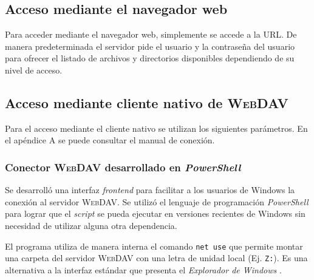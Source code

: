       \subsection {Acceso mediante el navegador web}

Para acceder mediante el navegador web, simplemente se accede a la URL. De manera predeterminada el servidor pide el usuario y la contrase\~{n}a del usuario para ofrecer el listado de  archivos y directorios disponibles dependiendo de su nivel de acceso.

      \subsection {Acceso mediante cliente nativo de \textsc{WebDAV}}

Para el acceso mediante el cliente nativo se utilizan los siguientes par\'{a}metros. En el ap\'{e}ndice A se puede consultar el manual de conexi\'{o}n.

{
 \begin{table}[H]
 \caption{Par\'{a}metros de conexi\'{o}n \textsc{WebDAV}}{}
 \label{tab:webdav-parameters}
 \noindent{} %
 \end{table}
}

        \subsubsection {Conector \textsc{WebDAV} desarrollado en \textsl{PowerShell}}

Se desarroll\'{o} una interfaz \textit{frontend} para facilitar a los usuarios de Windows la conexi\'{o}n al servidor \textsc{WebDAV}. Se utiliz\'{o} el lenguaje de programaci\'{o}n \textsl{PowerShell} para lograr que el \textit{script} se pueda ejecutar en versiones recientes de Windows sin necesidad de utilizar alguna otra dependencia.

El programa utiliza de manera interna el comando \texttt{net use} \cite{_net_????} que permite montar una carpeta del servidor \textsc{WebDAV} con una letra de unidad local (Ej. \texttt{Z:}). Es una alternativa a la interfaz est\'{a}ndar que presenta el \textit{Explorador de Windows} \cite{_create_????}.

